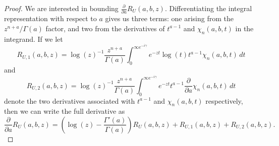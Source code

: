 \documentclass[11pt]{article}
\begin{document}
\begin{proof}
  We are interested in bounding
  \(\frac{\partial}{\partial a}R_U(a, b, z)\). Differentiating the
  integral representation with respect to \(a\) gives us three terms:
  one arising from the \(z^{n + a} / \Gamma(a)\) factor, and two from
  the derivatives of \(t^{a - 1}\) and \(\chi_{n}(a, b, t)\) in the
  integrand. If we let
  \begin{equation*}
    R_{U,1}(a, b, z) = \log(z)^{-1}\frac{z^{n + a}}{\Gamma(a)} \int_{0}^{\infty e^{-i\gamma}}e^{-zt}\log(t)t^{a - 1}\chi_{n}(a, b, t)\,dt
  \end{equation*}
  and
  \begin{equation*}
    R_{U,2}(a, b, z) = \log(z)^{-1}\frac{z^{n + a}}{\Gamma(a)} \int_{0}^{\infty e^{-i\gamma}}e^{-zt}t^{a - 1}\frac{\partial}{\partial a}\chi_{n}(a, b, t)\,dt
  \end{equation*}
  denote the two derivatives associated with \(t^{a - 1}\) and
  \(\chi_{n}(a, b, t)\) respectively, then we can write the full
  derivative as
  \begin{equation*}
    \frac{\partial}{\partial a}R_{U}(a, b, z)
    = \left(\log(z) - \frac{\Gamma'(a)}{\Gamma(a)}\right)R_{U}(a, b, z) + R_{U,1}(a, b, z) + R_{U,2}(a, b, z).
  \end{equation*}


\end{proof}
\end{document}
